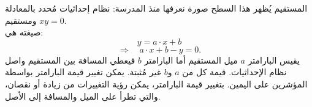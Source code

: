 \begin{surferPage}[مستقيم]{المستقيم}
يُظهر هذا السطح صورة نعرفها منذ المدرسة: نظام إحداثيات مُحدد بالمعادلة $xy=0$ ومستقيم.\\ صيغته هي: 
\[y=a\cdot x + b\]
\[ \Rightarrow \quad a\cdot x +b -y=0.\]
يقيس البارامتر $a$ ميل المستقيم أما البارامتر $b$ فيعطي المسافة بين المستقيم واصل نظام الإحداثيات.
\newline \newline
 قيمة كل من $a$ و$b$ غير مُثبتة. يمكن تغيير قيمة البارامتر بواسطة المؤشرين على اليمين. بتغيير قيمة البارامتر، يمكن رؤية التغييرات من زيادة أو نقصان، والتي تطرأ على الميل والمسافة إلى الأصل.
\end{surferPage}
